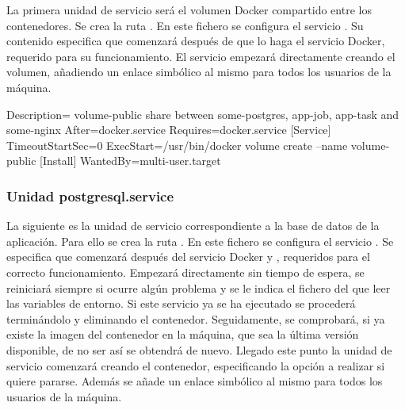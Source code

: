 La primera unidad de servicio será el volumen Docker compartido entre los contenedores. Se crea la ruta . En este fichero se configura el servicio . Su contenido especifica que comenzará después de que lo haga el servicio Docker, requerido para su funcionamiento. El servicio empezará directamente creando el volumen, añadiendo un enlace simbólico al mismo para todos los usuarios de la máquina. 

\begin{codelisting}
\label{code:volume-public.service}
\begin{code}
[Unit] 
  Description= volume-public share between some-postgres, app-job, app-task and 
               some-nginx 
  After=docker.service
  Requires=docker.service
[Service] 
  TimeoutStartSec=0 
  ExecStart=/usr/bin/docker volume create --name volume-public
[Install] 
  WantedBy=multi-user.target
\end{code}
\end{codelisting}

\subsubsection{Unidad postgresql.service}

La siguiente es la unidad de servicio correspondiente a la base de datos de la aplicación. Para ello se crea la ruta . En este fichero se configura el servicio . Se especifica que comenzará después del servicio Docker y , requeridos para el correcto funcionamiento. Empezará directamente sin tiempo de espera, se reiniciará siempre si ocurre algún problema y se le indica el fichero del que leer las variables de entorno. Si este servicio ya se ha ejecutado se procederá terminándolo y eliminando el contenedor. Seguidamente, se comprobará, si ya existe la imagen del contenedor en la máquina, que sea la última versión disponible, de no ser así se obtendrá de nuevo. Llegado este punto la unidad de servicio comenzará creando el contenedor, especificando la opción a realizar si quiere pararse. Además se añade un enlace simbólico al mismo para todos los usuarios de la máquina. 

